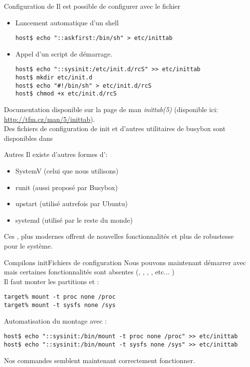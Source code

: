 \begin{frame}[fragile=singleslide]{Configuration de }
  Il est possible de configurer  avec le fichier
  \begin{itemize}
  \item Lancement automatique d'un shell
    \begin{lstlisting}
host$ echo "::askfirst:/bin/sh" > etc/inittab
    \end{lstlisting}
  \item Appel d'un script de démarrage.
    \begin{lstlisting}
host$ echo "::sysinit:/etc/init.d/rcS" >> etc/inittab
host$ mkdir etc/init.d
host$ echo "#!/bin/sh" > etc/init.d/rcS
host$ chmod +x etc/init.d/rcS
    \end{lstlisting}
  \end{itemize}
  Documentation disponible sur la page de man \emph{inittab(5)}
  (disponible ici: \url{http://tfm.cz/man/5/inittab}).\\[2ex]
  Des  fichiers de  configuration  de init  et  d'autres utilitaires  de
  busybox sont disponibles dans 
\end{frame}

\begin{frame}[fragile=singleslide]{Autres }
  Il existe d'autres formes d':
  \begin{itemize}
  \item SystemV (celui que nous utilisons)
  \item runit (aussi proposé par Busybox)
  \item upstart (utilisé autrefois par Ubuntu)
  \item systemd (utilisé par le reste du monde)
  \end{itemize}
  Ces ,  plus modernes  offrent de nouvelles  fonctionnalités et
  plus de robustesse pour le système.
\end{frame}

\begin{frame}[fragile=singleslide]{Compilons init}{Fichiers de configuration}
  Nous  pouvons  maintenant  démarrer avec    mais
  certaines fonctionnalités sont absentes (, ,
  , , etc... )\\
  Il faut monter les partitions  et :
  \begin{lstlisting}
target% mount -t proc none /proc
target% mount -t sysfs none /sys
  \end{lstlisting}
  Automatisation du montage avec :
  \begin{lstlisting}
host$ echo "::sysinit:/bin/mount -t proc none /proc" >> etc/inittab
host$ echo "::sysinit:/bin/mount -t sysfs none /sys" >> etc/inittab
  \end{lstlisting}
  Nos commandes semblent maintenant correctement fonctionner.
\end{frame}

